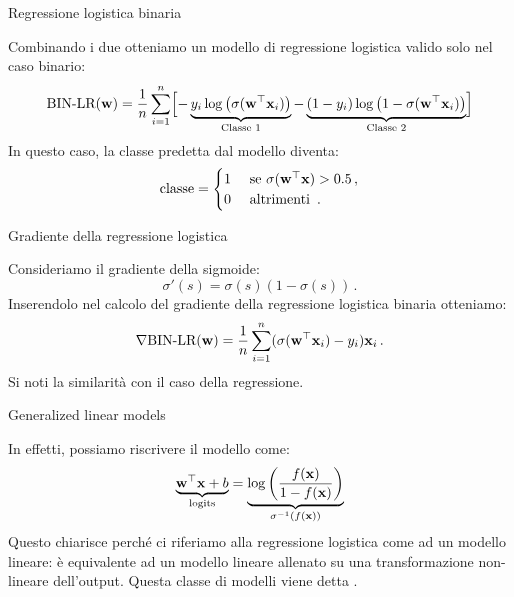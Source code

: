 \documentclass[12pt,aspectratio=169]{beamer}
\begin{document}
\begin{frame}{Regressione logistica binaria}

	Combinando i due otteniamo un modello di regressione logistica valido solo nel caso binario:
	\begin{equation}
		\text{BIN-LR}(\boldsymbol{\mathbf{w}}) = \frac{1}{n} \sum_{i=1}^n \Bigl[ -\underbrace{y_i\log\left(\sigma(\boldsymbol{\mathbf{w}}^\top\boldsymbol{\mathbf{x}}_i)\right)}_{\text{Classe 1}} - \underbrace{(1-y_i)\log\left( 1 - \sigma(\boldsymbol{\mathbf{w}}^\top\boldsymbol{\mathbf{x}}_i)\right)}_{\text{Classe 2}} \Bigr]
	\end{equation}
	In questo caso, la classe predetta dal modello diventa:
	\begin{equation}
		\text{classe} = \begin{cases}
			1 & \text{ se } \sigma(\boldsymbol{\mathbf{w}}^\top\boldsymbol{\mathbf{x}}) > 0.5 \,, \\
			0 & \text{ altrimenti } \,.
		\end{cases}
	\end{equation}

\end{frame}

\begin{frame}{Gradiente della regressione logistica}

	Consideriamo il gradiente della sigmoide:
	\begin{equation}
		\sigma'(s) = \sigma(s)(1 - \sigma(s)) \,.
	\end{equation}
	Inserendolo nel calcolo del gradiente della regressione logistica binaria otteniamo:
	\begin{equation}
		\nabla \text{BIN-LR}(\boldsymbol{\mathbf{w}}) = \frac{1}{n} \sum_{i=1}^n (\sigma(\boldsymbol{\mathbf{w}}^\top\boldsymbol{\mathbf{x}}_i) - y_i)\boldsymbol{\mathbf{x}}_i \,.
	\end{equation}
	Si noti la similarità con il caso della regressione.

\end{frame}

\begin{frame}{Generalized linear models}

	In effetti, possiamo riscrivere il modello come:
	\begin{equation}
		\underbrace{\mathbf{w}^\top \mathbf{x}+b}_{\text{logits}}=\underbrace{\log\left(\frac{f(\boldsymbol{\mathbf{x}})}{1-f(\boldsymbol{\mathbf{x}})}\right)}_{\sigma^{-1}(f(\boldsymbol{\mathbf{x}}))}
	\end{equation}
	Questo chiarisce perché ci riferiamo alla regressione logistica come ad un modello lineare: è equivalente ad un modello lineare allenato su una transformazione non-lineare dell'output. Questa classe di modelli viene detta .

\end{frame}
\end{document}
